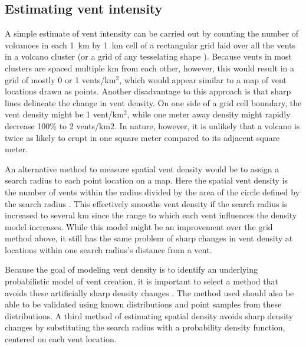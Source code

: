 \subsection{Estimating vent intensity} 
A simple estimate of vent intensity can be carried out by counting the number of volcanoes in each 1~km by 1~km cell of a rectangular grid laid over all the vents in a volcano cluster \citep{lutz1995improved} (or a grid of any tesselating shape \citep{glaze2005statistical}). Because vents in most clusters are spaced multiple km from each other, however, this would result in a grid of mostly 0 or 1 vents/km$^2$, which would appear similar to a map of vent locations drawn as points. Another disadvantage to this approach is that sharp lines delineate the change in vent density. On one side of a grid cell boundary, the vent density might be 1 vent/km$^2$, while one meter away density might rapidly decrease 100\% to 2 vents/km$2$. In nature, however, it is unlikely that a volcano is twice as likely to erupt in one square meter compared to its adjacent square meter.

An alternative method to measure spatial vent density would be to assign a search radius to each point location on a map. Here the spatial vent density is the number of vents within the radius divided by the area of the circle defined by the search radius \citep{connor1987structure,connor1990cinder}. This effectively smooths vent density if the search radius is increased to several km since the range to which each vent influences the density model increases. While this model might be an improvement over the grid method above, it still has the same problem of sharp changes in vent density at locations within one search radius's distance from a vent. 

Because the goal of modeling vent density is to identify an underlying probabilistic model of vent creation, it is important to select a method that avoids these artificially sharp density changes \citep{connor1995three}. The method used should also be able to be validated using known distributions and point samples from these distributions. A third method of estimating spatial density avoids sharp density changes by substituting the search radius with a probability density function, centered on each vent location.

